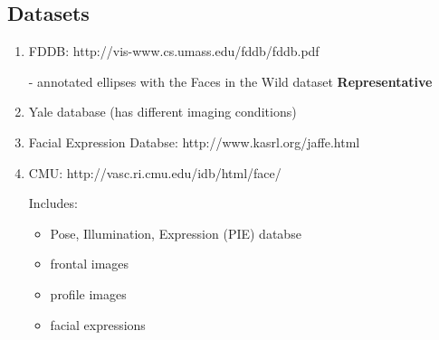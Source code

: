 \documentclass[11pt, twocolumn]{article} %
\theoremstyle{plain}
\theoremstyle{definition}
\theoremstyle{remark}
\numberwithin{equation}{section} %
\numberwithin{figure}{section} %
\numberwithin{table}{section} %
\begin{document}
\subsection{Datasets}
\begin{enumerate}
  \item FDDB: http://vis-www.cs.umass.edu/fddb/fddb.pdf 

    - annotated ellipses with the Faces in the Wild dataset
    \textbf{Representative}

  \item Yale database (has different imaging conditions)
  \item Facial Expression Databse: http://www.kasrl.org/jaffe.html
  \item CMU: http://vasc.ri.cmu.edu/idb/html/face/

  Includes:
  \begin{itemize}
    \item Pose, Illumination, Expression (PIE) databse
    \item frontal images
    \item profile images
    \item facial expressions
  \end{itemize}
\end{enumerate}
\end{document}
